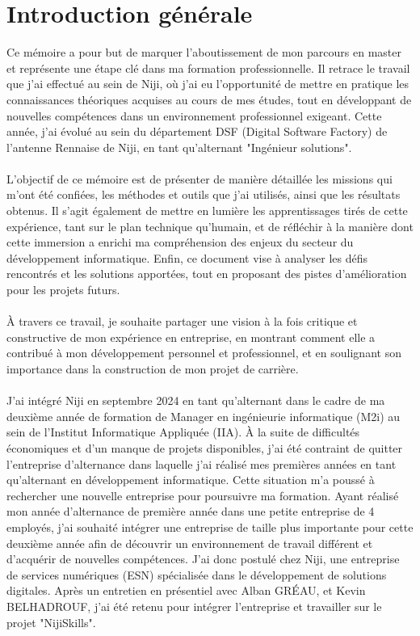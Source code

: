 \documentclass[12pt]{article}
\begin{document}
\section{Introduction générale}
Ce mémoire a pour but de marquer l'aboutissement de mon parcours en master et représente une étape clé dans ma formation professionnelle. Il retrace le travail que j’ai effectué au sein de Niji, où j’ai eu l’opportunité de mettre en pratique les connaissances théoriques acquises au cours de mes études, tout en développant de nouvelles compétences dans un environnement professionnel exigeant. Cette année, j'ai évolué au sein du département DSF (Digital Software Factory) de l'antenne Rennaise de Niji, en tant qu'alternant "Ingénieur solutions".
\\\\
L’objectif de ce mémoire est de présenter de manière détaillée les missions qui m’ont été confiées, les méthodes et outils que j’ai utilisés, ainsi que les résultats obtenus. Il s’agit également de mettre en lumière les apprentissages tirés de cette expérience, tant sur le plan technique qu’humain, et de réfléchir à la manière dont cette immersion a enrichi ma compréhension des enjeux du secteur du développement informatique. Enfin, ce document vise à analyser les défis rencontrés et les solutions apportées, tout en proposant des pistes d’amélioration pour les projets futurs.
\\\\
À travers ce travail, je souhaite partager une vision à la fois critique et constructive de mon expérience en entreprise, en montrant comment elle a contribué à mon développement personnel et professionnel, et en soulignant son importance dans la construction de mon projet de carrière.
\\\\
J'ai intégré Niji en septembre 2024 en tant qu'alternant dans le cadre de ma deuxième année de formation de Manager en ingénieurie informatique (M2i) au sein de l'Institut Informatique Appliquée (IIA). À la suite de difficultés économiques et d'un manque de projets disponibles, j'ai été contraint de quitter l'entreprise d'alternance dans laquelle j'ai réalisé mes premières années en tant qu'alternant en développement informatique. Cette situation m'a poussé à rechercher une nouvelle entreprise pour poursuivre ma formation. Ayant réalisé mon année d'alternance de première année dans une petite entreprise de 4 employés, j'ai souhaité intégrer une entreprise de taille plus importante pour cette deuxième année afin de découvrir un environnement de travail différent et d'acquérir de nouvelles compétences. J'ai donc postulé chez Niji, une entreprise de services numériques (ESN) spécialisée dans le développement de solutions digitales. Après un entretien en présentiel avec Alban GRÉAU, et Kevin BELHADROUF, j'ai été retenu pour intégrer l'entreprise et travailler sur le projet "NijiSkills".
\newpage
\end{document}
